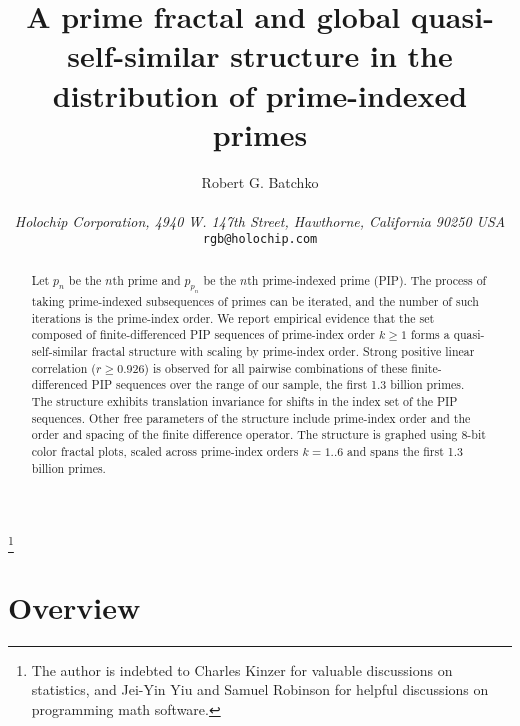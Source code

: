 \documentclass[12pt,longtitle,times]{amsart}
\begin{document}

\title[A prime fractal]{A prime fractal and global quasi-self-similar structure in the distribution of prime-indexed primes}

\author[R.G.~Batchko]{Robert G. Batchko\\
\\
\textit{H\lowercase{olochip} C\lowercase{orporation}, 4940 W. 147\lowercase{th} S\lowercase{treet}, H\lowercase{awthorne}, C\lowercase{alifornia} 90250 USA}\\
\lowercase{\texttt{rgb@holochip.com}}\\
}

\thanks{The author is indebted to Charles Kinzer for valuable discussions on statistics, and Jei-Yin Yiu and Samuel Robinson for helpful discussions on programming math software.}

\begin{abstract}
Let $p_n$ be the $n$th prime and $p_{p_n}$ be the $n$th prime-indexed prime (PIP). The process of taking prime-indexed subsequences of primes can be iterated, and the number of such iterations is the prime-index order. We report empirical evidence that the set composed of finite-differenced PIP sequences of prime-index order $k\geq{}1$ forms a quasi-self-similar fractal structure with scaling by prime-index order. Strong positive linear correlation ($r\geq{}0.926$) is observed for all pairwise combinations of these finite-differenced PIP sequences over the range of our sample, the first 1.3 billion primes. The structure exhibits translation invariance for shifts in the index set of the PIP sequences. Other free parameters of the structure include prime-index order and the order and spacing of the finite difference operator.  The structure is graphed using 8-bit color fractal plots, scaled across prime-index orders $k=1..6$ and spans the first 1.3 billion primes. 
\end{abstract}
\maketitle

\section{Overview}\label{Section:Introduction}
\end{document}

